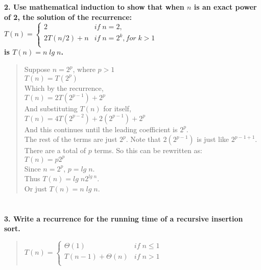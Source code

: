 \documentclass{article}
\begin{document}
\section*{}
\textbf{2. Use mathematical induction to show that when $n$ is an exact power of 2, the solution of the recurrence:\\
$T(n) = 
\left\{ 
\begin{array}{ll}
2            & if\; n = 2,\\
2T(n/2) + n  & if\; n = 2^k, for\; k > 1\\
\end{array}
\right.$\\
is $T(n) = n\; lg\; n$.\\}
\begin{quote}
\textsf{Suppose $n = 2^p$, where $p > 1$\\
$T(n) = T(2^p)$\\
Which by the recurrence,\\
$T(n) = 2T(2^{p-1}) + 2^p$\\
And substituting $T(n)$ for itself,\\
$T(n) = 4T(2^{p-2}) + 2(2^{p-1}) + 2^p$\\
And this continues until the leading coefficient is $2^p$.\\
The rest of the terms are just $2^p$. Note that $2(2^{p-1})$ is just like $2^{p-1+1}$.\\
There are a total of $p$ terms. So this can be rewritten as:\\
$T(n) = p2^p$\\
Since $n = 2^p$, $p = lg\; n$.\\
Thus $T(n) = lg\; n2^{lg\; n}$.\\
Or just $T(n) = n\; lg\; n$.\\}
\end{quote}

\pagebreak

\section*{}
\textbf{3. Write a recurrence for the running time of a recursive insertion sort.}

\begin{quote}
\textsf{$T(n) = 
\left\{
\begin{array}{ll}
\Theta(1)          & if\; n\leq 1\\
T(n-1) + \Theta(n) & if\; n > 1\\
\end{array}
\right.$
}
\end{quote}
\end{document}
